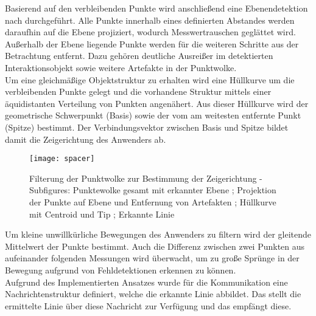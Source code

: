 Basierend auf den verbleibenden Punkte wird anschließend eine Ebenendetektion nach \cite{Fischler1981} durchgeführt. Alle Punkte innerhalb eines definierten Abstandes werden daraufhin auf die \red[approximierte] Ebene projiziert, wodurch Messwertrauschen geglättet wird. Außerhalb der Ebene liegende Punkte werden für die weiteren Schritte aus der Betrachtung entfernt. Dazu gehören deutliche Ausreißer im detektierten Interaktionsobjekt sowie weitere Artefakte in der Punktwolke.\\

Um eine gleichmäßige Objektstruktur zu erhalten wird eine Hüllkurve um die verbleibenden Punkte gelegt und die vorhandene Struktur mittels einer äquidistanten Verteilung von Punkten angenähert. Aus dieser Hüllkurve wird der geometrische Schwerpunkt (Basis) sowie der vom \kps{} am weitesten entfernte Punkt (Spitze) bestimmt. Der Verbindungsvektor zwischen Basis und Spitze bildet damit die Zeigerichtung des Anwenders ab.\\

\begin{figure}[!ht]
	\begin{center}
		\texttt{[image: spacer]}
		\caption{Filterung der Punktwolke zur Bestimmung der Zeigerichtung - Subfigures: Punktewolke gesamt mit erkannter Ebene ; Projektion der Punkte auf Ebene und Entfernung von Artefakten ; Hüllkurve mit Centroid und Tip ; Erkannte Linie}
		\label{fig.intdir}
	\end{center}
\end{figure}

Um kleine unwillkürliche Bewegungen des Anwenders zu filtern wird der gleitende Mittelwert der Punkte bestimmt. Auch die Differenz zwischen zwei Punkten aus aufeinander folgenden Messungen wird überwacht, um zu große Sprünge in der Bewegung aufgrund von Fehldetektionen erkennen zu können.\\
Aufgrund des Implementierten Ansatzes wurde für die Kommunikation eine Nachrichtenstruktur definiert, welche die erkannte Linie abbildet. Das \mInteraction stellt die ermittelte Linie über diese Nachricht zur Verfügung und das \red[\mVisualization ?] empfängt diese.\\

